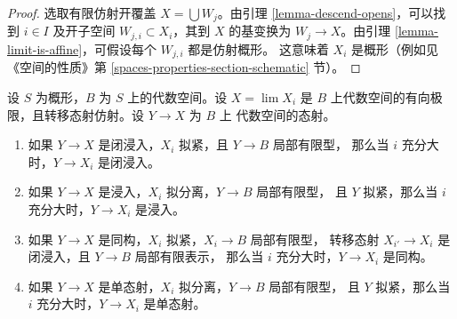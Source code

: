 \begin{proof}
选取有限仿射开覆盖 $X=\bigcup W_j$。由引理
\ref{lemma-descend-opens}，可以找到 $i\in I$ 及开子空间
$W_{j,i}\subset X_i$，其到 $X$ 的基变换为 $W_j\to X$。由引理
\ref{lemma-limit-is-affine}，可假设每个 $W_{j,i}$ 都是仿射概形。
这意味着 $X_i$ 是概形（例如见《空间的性质》第
\ref{spaces-properties-section-schematic} 节）。
\end{proof}

\begin{lemma}
\label{lemma-finite-type-eventually-closed}
设 $S$ 为概形，$B$ 为 $S$ 上的代数空间。设 $X=\lim X_i$ 是 $B$
上代数空间的有向极限，且转移态射仿射。设 $Y\to X$ 为 $B$ 上
代数空间的态射。
\begin{enumerate}
\item 如果 $Y\to X$ 是闭浸入，$X_i$ 拟紧，且 $Y\to B$ 局部有限型，
那么当 $i$ 充分大时，$Y\to X_i$ 是闭浸入。
\item 如果 $Y\to X$ 是浸入，$X_i$ 拟分离，$Y\to B$ 局部有限型，
且 $Y$ 拟紧，那么当 $i$ 充分大时，$Y\to X_i$ 是浸入。
\item 如果 $Y\to X$ 是同构，$X_i$ 拟紧，$X_i\to B$ 局部有限型，
转移态射 $X_{i'}\to X_i$ 是闭浸入，且 $Y\to B$ 局部有限表示，
那么当 $i$ 充分大时，$Y\to X_i$ 是同构。
\item 如果 $Y\to X$ 是单态射，$X_i$ 拟分离，$Y\to B$ 局部有限型，
且 $Y$ 拟紧，那么当 $i$ 充分大时，$Y\to X_i$ 是单态射。
\end{enumerate}
\end{lemma}


